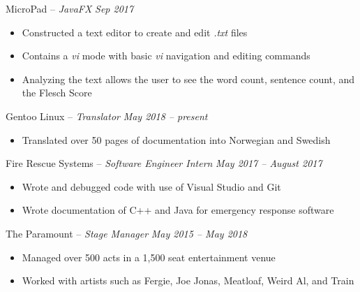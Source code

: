 \documentclass[11pt,letterpaper]{article}
\begin{document}
\headedsection 
{MicroPad -- \textit{JavaFX}}
{\textit{Sep 2017}} {
		\begin{itemize}[noitemsep,nolistsep]
	\item Constructed a text editor to create and edit \textit{.txt} files
	\item Contains a \textit{vi} mode with basic \textit{vi} navigation and editing commands
	\item Analyzing the text allows the user to see the word count, sentence count, and the Flesch Score
\end{itemize}
}


\spacedhrule{0em}{-0.9em} 



\headedsection
{Gentoo Linux -- \textit{Translator}}
{\textit{May 2018 -- present}} {
	\begin{itemize}[noitemsep,nolistsep]
		\item Translated over 50 pages of documentation into Norwegian and Swedish
	\end{itemize}
}


\headedsection 
{Fire Rescue Systems -- \textit{Software Engineer Intern}}
{\textit{May 2017 -- August 2017}} {
	\begin{itemize}[noitemsep,nolistsep]
		\item Wrote and debugged code with use of Visual Studio and Git
		\item Wrote documentation of C++ and Java for emergency response software
	\end{itemize}
}


\headedsection 
{The Paramount -- \textit{Stage Manager}}
{\textit{May 2015 -- May 2018}} {
	\begin{itemize}[noitemsep,nolistsep]
		\item Managed over 500 acts in a 1,500 seat entertainment venue
		\item Worked with artists such as Fergie, Joe Jonas, Meatloaf, Weird Al, and Train
	\end{itemize}
}
\end{document}
